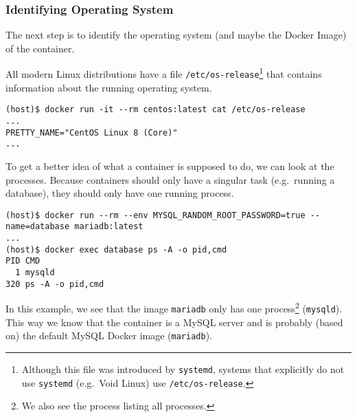 \subsubsection{Identifying Operating System}

The next step is to identify the operating system (and maybe the Docker Image) of the container.

All modern Linux distributions have a file \lstinline{/etc/os-release}\footnote{Although this file was introduced by \lstinline{systemd}, systems that explicitly do not use \lstinline{systemd} (e.g.\ Void Linux) use \lstinline{/etc/os-release}.} that contains information about the running operating system.
\begin{lstlisting}[caption={CentOS container \lstinline{/etc/os-release}},captionpos=b]
(host)$ docker run -it --rm centos:latest cat /etc/os-release
...
PRETTY_NAME="CentOS Linux 8 (Core)"
...
\end{lstlisting}

To get a better idea of what a container is supposed to do, we can look at the processes. Because containers should only have a singular task (e.g.\ running a database), they should only have one running process.

\begin{lstlisting}[caption={A container only has one process},captionpos=b]
(host)$ docker run --rm --env MYSQL_RANDOM_ROOT_PASSWORD=true --name=database mariadb:latest
...
(host)$ docker exec database ps -A -o pid,cmd
PID CMD
  1 mysqld
320 ps -A -o pid,cmd
\end{lstlisting}

In this example, we see that the image \lstinline{mariadb} only has one process\footnote{We also see the process listing all processes.} (\lstinline{mysqld}). This way we know that the container is a MySQL server and is probably (based on) the default MySQL Docker image (\lstinline{mariadb}).

